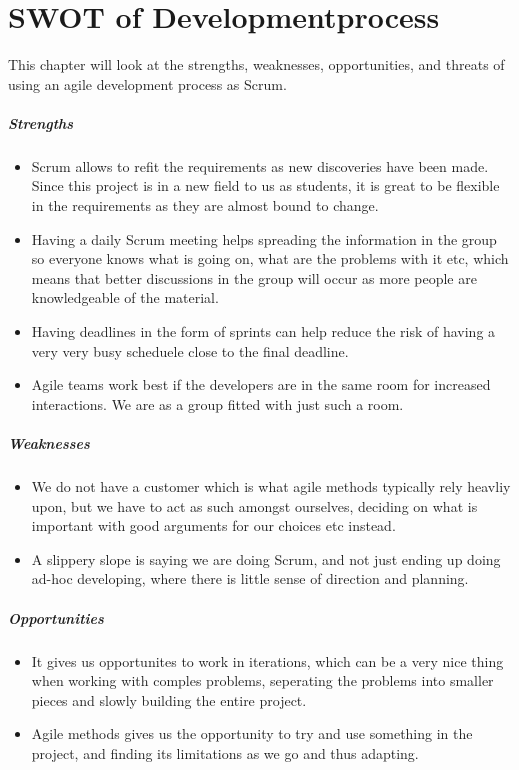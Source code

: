 \chapter{SWOT of Developmentprocess}
This chapter will look at the strengths, weaknesses, opportunities, and threats of using an agile development process as Scrum.
\paragraph{Strengths}
\begin{itemize}
        \item Scrum allows to refit the requirements as new discoveries have been made. Since this project is in a new field to us as students, it is great to be flexible in the requirements as they are almost bound to change.
        \item Having a daily Scrum meeting helps spreading the information in the group so everyone knows what is going on, what are the problems with it etc, which means that better discussions in the group will occur as more people are knowledgeable of the material.
        \item Having deadlines in the form of sprints can help reduce the risk of having a very very busy scheduele close to the final deadline.
        \item Agile teams work best if the developers are in the same room for increased interactions. We are as a group fitted with just such a room.
\end{itemize}
\paragraph{Weaknesses} 
\begin{itemize}
        \item We do not have a customer which is what agile methods typically rely heavliy upon, but we have to act as such amongst ourselves, deciding on what is important with good arguments for our choices etc instead.
        \item A slippery slope is saying we are doing Scrum, and not just ending up doing ad-hoc developing, where there is little sense of direction and planning.
\end{itemize}
\paragraph{Opportunities} 
\begin{itemize}
        \item It gives us opportunites to work in iterations, which can be a very nice thing when working with comples problems, seperating the problems into smaller pieces and slowly building the entire project.
        \item Agile methods gives us the opportunity to try and use something in the project, and finding its limitations as we go and thus adapting.
\end{itemize}
